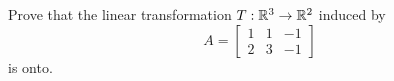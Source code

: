 \documentclass{ximera}
\begin{document}
\begin{example}Prove that the linear transformation $T:\mathbb{R}^3\rightarrow \mathbb{R}^2$ induced by $$A=\begin{bmatrix}1&1&-1\\2&3&-1\end{bmatrix}$$ is onto.




\end{example}
\end{document}
